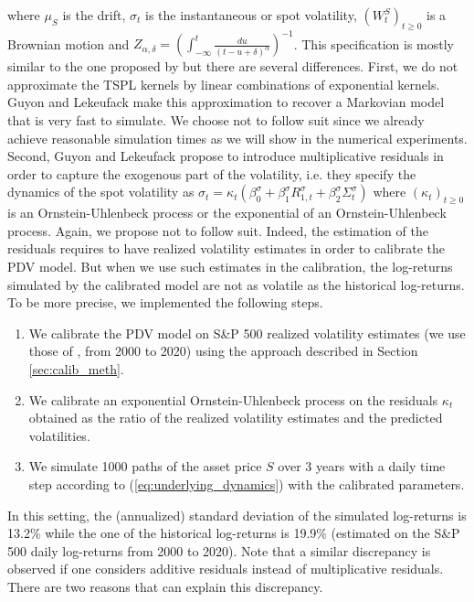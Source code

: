 where $\mu_S$ is the drift, $\sigma_t$ is the instantaneous or spot volatility, $(W^S_t)_{t\ge 0}$ is a Brownian motion and $Z_{\alpha,\delta} = \left(\int_{-\infty}^t \frac{du}{(t-u+\delta)^{\alpha}} \right)^{-1}$. This specification is mostly similar to the one proposed by \cite{guyon2022volatility} but there are several differences. First, we do not approximate the TSPL kernels by linear combinations of exponential kernels. Guyon and Lekeufack make this approximation to recover a Markovian model that is very fast to simulate. We choose not to follow suit since we already achieve reasonable simulation times as we will show in the numerical experiments. Second, Guyon and Lekeufack propose to introduce multiplicative residuals in order to capture the exogenous part of the volatility, i.e. they specify the dynamics of the spot volatility as $\sigma_t = \kappa_t(\beta_0^{\sigma} + \beta_1^{\sigma} R^{\sigma}_{1,t}+\beta_2^{\sigma} \Sigma_t^{\sigma})$ where $(\kappa_t)_{t\ge 0}$ is an Ornstein-Uhlenbeck process or the exponential of an Ornstein-Uhlenbeck process. Again, we propose not to follow suit. Indeed, the estimation of the residuals requires to have realized volatility estimates in order to calibrate the PDV model. But when we use such estimates in the calibration, the log-returns simulated by the calibrated model are not as volatile as the historical log-returns. To be more precise, we implemented the following steps.
\begin{enumerate}
    \item We calibrate the PDV model on S\&P 500 realized volatility estimates (we use those of \citeauthor{heber2009oxford}, \citeyear{heber2009oxford} from 2000 to 2020) using the approach described in Section \ref{sec:calib_meth}.
    \item We calibrate an exponential Ornstein-Uhlenbeck process on the residuals $\kappa_t$ obtained as the ratio of the realized volatility estimates and the predicted volatilities.
    \item We simulate 1000 paths of the asset price $S$ over 3 years with a daily time step according to (\ref{eq:underlying_dynamics}) with the calibrated parameters.
\end{enumerate}
In this setting, the (annualized) standard deviation of the simulated log-returns is 13.2\% while the one of the historical log-returns is 19.9\% (estimated on the S\&P 500 daily log-returns from 2000 to 2020). Note that a similar discrepancy is observed if one considers additive residuals instead of multiplicative residuals. There are two reasons that can explain this discrepancy.

